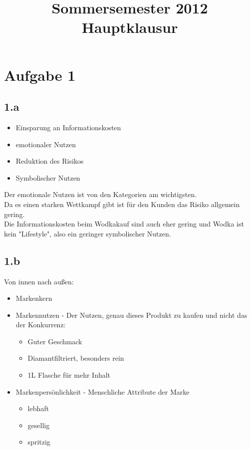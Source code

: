 

\title{Sommersemester 2012 Hauptklausur}
\maketitle

\section*{Aufgabe 1}
\subsection*{1.a}
    \begin{itemize}
        \item Einsparung an Informationskosten
        \item emotionaler Nutzen
        \item Reduktion des Risikos
        \item Symbolischer Nutzen
    \end{itemize}

    Der emotionale Nutzen ist von den Kategorien am wichtigsten. \\
    Da es einen starken Wettkampf gibt ist für den Kunden das Risiko allgemein gering. \\
    Die Informationskosten beim Wodkakauf sind auch eher gering und Wodka ist kein "Lifestyle", also ein geringer symbolischer Nutzen.
\subsection*{1.b}
Von innen nach außen:
    \begin{itemize}
        \item Markenkern
        \item Markennutzen - Der Nutzen, genau dieses Produkt zu kaufen und nicht das der Konkurrenz:
        \begin{itemize}
            \item Guter Geschmack
            \item Diamantfiltriert, besonders rein
            \item 1L Flasche für mehr Inhalt
        \end{itemize}
        \item Markenpersönlichkeit - Menschliche Attribute der Marke
        \begin{itemize}
            \item lebhaft
            \item gesellig
            \item spritzig
        \end{itemize}
    \end{itemize}
